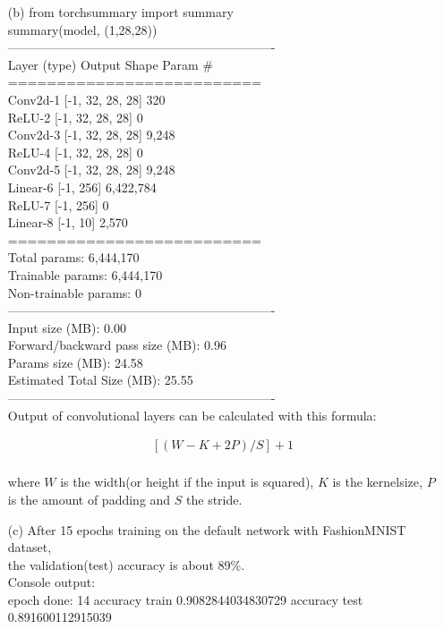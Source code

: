 \documentclass [a4paper, 11pt] {article}
\begin{document}
\begin{enumerate}
\item[(b)]
from torchsummary import summary\\
summary(model, (1,28,28))\\
----------------------------------------------------------------\\
Layer (type)               Output Shape         Param \#\\
==========================\\
Conv2d-1           [-1, 32, 28, 28]             320\\
ReLU-2           [-1, 32, 28, 28]               0\\
Conv2d-3           [-1, 32, 28, 28]           9,248\\
ReLU-4           [-1, 32, 28, 28]               0\\
Conv2d-5           [-1, 32, 28, 28]           9,248\\
Linear-6                  [-1, 256]       6,422,784\\
ReLU-7                  [-1, 256]               0\\
Linear-8                   [-1, 10]           2,570\\
==========================\\
Total params: 6,444,170\\
Trainable params: 6,444,170\\
Non-trainable params: 0\\
----------------------------------------------------------------\\
Input size (MB): 0.00\\
Forward/backward pass size (MB): 0.96\\
Params size (MB): 24.58\\
Estimated Total Size (MB): 25.55\\
----------------------------------------------------------------\\

Output of convolutional layers can be calculated with this formula: 

\begin{align*}
\left[(W-K+2P)/S\right]+1 \\
\end{align*}

where $W$ is the width(or height if the input is squared), $K$ is the kernelsize, $P$ is the amount of padding and $S$ the stride.

\item[(c)]
After 15 epochs training on the default network with FashionMNIST dataset, \\
the validation(test) accuracy is about 89\%.\\
Console output:\\
epoch done:  14
accuracy train 0.9082844034830729
accuracy test 0.891600112915039\\
\\


\end{enumerate}
\end{document}
